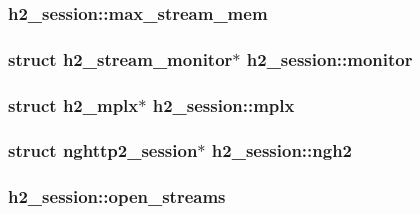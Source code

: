 \subsubsection[{\texorpdfstring{max\+\_\+stream\+\_\+mem}{max_stream_mem}}]{ h2\+\_\+session\+::max\+\_\+stream\+\_\+mem}\hypertarget{structh2__session_abecafc57e4ac2320b1310e5e8506d152}{}\label{structh2__session_abecafc57e4ac2320b1310e5e8506d152}
\subsubsection[{\texorpdfstring{monitor}{monitor}}]{\setlength{\rightskip}{0pt plus 5cm}struct {\bf h2\+\_\+stream\+\_\+monitor}$\ast$ h2\+\_\+session\+::monitor}\hypertarget{structh2__session_aae4758b20d0ba0c4d3642298ed900029}{}\label{structh2__session_aae4758b20d0ba0c4d3642298ed900029}
\subsubsection[{\texorpdfstring{mplx}{mplx}}]{\setlength{\rightskip}{0pt plus 5cm}struct {\bf h2\+\_\+mplx}$\ast$ h2\+\_\+session\+::mplx}\hypertarget{structh2__session_a79ed4d816ae7efbb0f109875350c7b42}{}\label{structh2__session_a79ed4d816ae7efbb0f109875350c7b42}
\subsubsection[{\texorpdfstring{ngh2}{ngh2}}]{\setlength{\rightskip}{0pt plus 5cm}struct nghttp2\+\_\+session$\ast$ h2\+\_\+session\+::ngh2}\hypertarget{structh2__session_add0721875b1a24e581d276149984af8f}{}\label{structh2__session_add0721875b1a24e581d276149984af8f}
\subsubsection[{\texorpdfstring{open\+\_\+streams}{open_streams}}]{ h2\+\_\+session\+::open\+\_\+streams}\hypertarget{structh2__session_a604a5590a0033434c6def4d0ce7b4cfc}{}\label{structh2__session_a604a5590a0033434c6def4d0ce7b4cfc}
